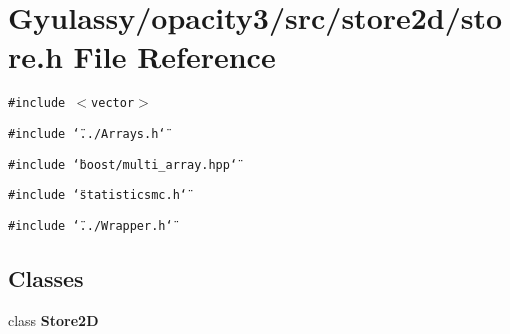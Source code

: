 \section{Gyulassy/opacity3/src/store2d/store.h File Reference}
\label{store_8h}
{\tt \#include $<$vector$>$}\par
{\tt \#include \char`\"{}../Arrays.h\char`\"{}}\par
{\tt \#include \char`\"{}boost/multi\_\-array.hpp\char`\"{}}\par
{\tt \#include \char`\"{}statisticsmc.h\char`\"{}}\par
{\tt \#include \char`\"{}../Wrapper.h\char`\"{}}\par
\subsection*{Classes}
\begin{CompactItemize}
\item 
class {\bf Store2D}
\end{CompactItemize}
